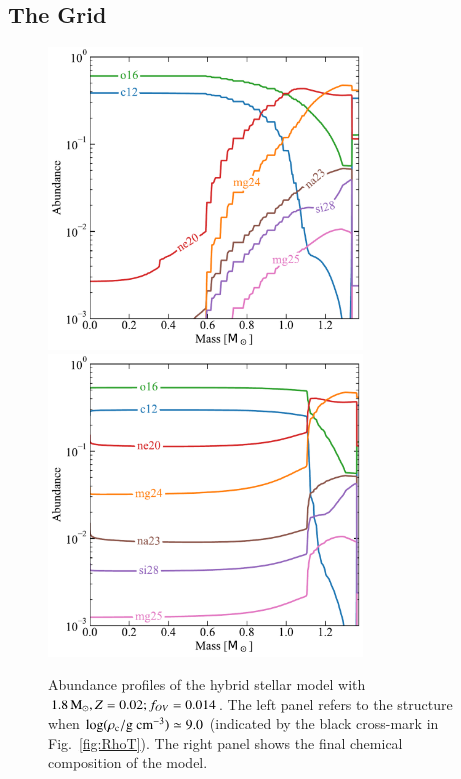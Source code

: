 \documentclass[main.tex]{subfiles}
\begin{document}
\begin{subappendices}
\section{The \seriesone Grid}\label{apx:ch2:composition_seriesI}


\begin{figure}[hbt!]
    \centering
    \includegraphics[height=8cm]{figures/chapter2/abundances/1p8_logRho9_abun.pdf}\quad
    \includegraphics[height=8cm]{figures/chapter2/abundances/1p8_final_abun.pdf}
    \caption{Abundance profiles of the \seriesone hybrid stellar model with $ 1.8\mathrm{\,M_\odot},  Z=0.02;f_{OV}=0.014$. The left panel refers to the structure when $\rm \log(\rho_c / g \ cm^{-3}) \simeq 9.0$ (indicated by the black cross-mark in Fig.~\ref{fig:RhoT}). The right panel shows the final chemical composition of the model.} 
\end{figure}


\end{subappendices}
\end{document}
